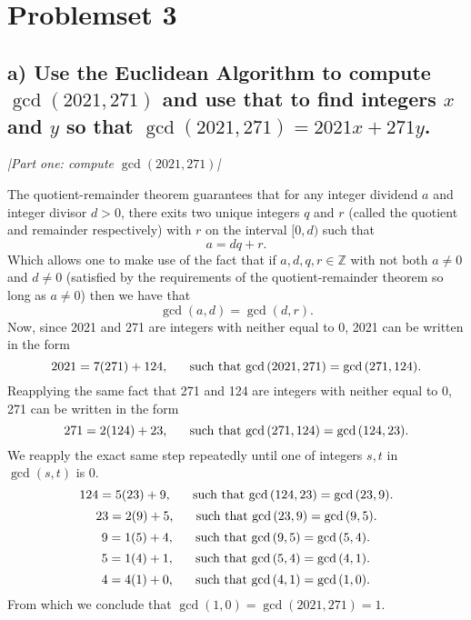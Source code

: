 \documentclass[11pt, letterpaper]{article}
\begin{document}
\section*{Problemset 3}

\subsection*{a) Use the Euclidean Algorithm to compute $\gcd{(2021, 271)}$ and use that to find integers $x$ and $y$ so that $\gcd{(2021, 271)}=2021x+271y$.}
{\large\it |Part one: compute $\gcd{(2021, 271)}$|}
\begin{sol}
    The quotient-remainder theorem guarantees that for any integer dividend $a$ and integer divisor $d> 0$, there exits two unique integers $q$ and $r$ 
    (called the quotient and remainder respectively) with $r$ on the interval $[0,d)$ such that
    \[a=dq+r\text{.}\]
    Which allows one to make use of the fact that if $a,d,q,r\in \mathbb{Z}$ with not both $a\neq 0$ and $d\neq 0$ (satisfied by the
    requirements of the quotient-remainder theorem so long as $a\neq 0$) then we have that
    \[\gcd{(a,d)}=\gcd{(d,r)}\text{.}\]
    Now, since 2021 and 271 are integers with neither equal to 0, 2021 can be written in the form
    \[2021=7(271)+124\text{, \indent such that $\gcd{(2021,271)}=\gcd{(271,124)}$.}\]
    Reapplying the same fact that 271 and 124 are integers with neither equal to 0, 271 can be written in the form 
    \[271=2(124)+23\text{, \indent such that $\gcd{(271,124)}=\gcd{(124,23)}$.}\]
    We reapply the exact same step repeatedly until one of integers $s,t$ in $\gcd{(s, t)}$ is 0. 
    \[124=5(23)+9\text{, \indent such that $\gcd{(124,23)}=\gcd{(23,9)}$.}\]
    \[23=2(9)+5\text{, \indent such that $\gcd{(23,9)}=\gcd{(9,5)}$.}\]
    \[9=1(5)+4\text{, \indent such that $\gcd{(9,5)}=\gcd{(5,4)}$.}\]
    \[5=1(4)+1\text{, \indent such that $\gcd{(5,4)}=\gcd{(4,1)}$.}\]
    \[4=4(1)+0\text{, \indent such that $\gcd{(4,1)}=\gcd{(1,0)}$.}\]
    From which we conclude that $\gcd{(1,0)}=\gcd{(2021,271)}=1$.
\end{sol}
\end{document}
